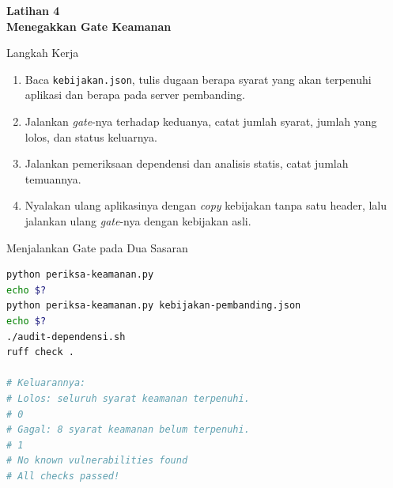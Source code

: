 \documentclass[aspectratio=169, table, 12pt]{beamer}
\begin{document}
\begin{frame}{\hfill}
  \centering
  \Huge{\textbf{Latihan 4\\Menegakkan Gate Keamanan}}
\end{frame}

\begin{frame}{{\Large Langkah Kerja}}
  \vspace{6pt}
  \begin{enumerate}
    \item Baca \texttt{kebijakan.json}, tulis dugaan berapa syarat yang akan
          terpenuhi aplikasi dan berapa pada server pembanding.
    \item Jalankan \textit{gate}-nya terhadap keduanya, catat jumlah syarat, jumlah
          yang lolos, dan status keluarnya.
    \item Jalankan pemeriksaan dependensi dan analisis statis, catat jumlah
          temuannya.
    \item Nyalakan ulang aplikasinya dengan \textit{copy} kebijakan tanpa satu
          header, lalu jalankan ulang \textit{gate}-nya dengan kebijakan asli.
  \end{enumerate}
\end{frame}

\begin{frame}[fragile]{{\Large Menjalankan Gate pada Dua Sasaran}}
  \vspace{2pt}
\begin{lstlisting}[language=bash]
python periksa-keamanan.py
echo $?
python periksa-keamanan.py kebijakan-pembanding.json
echo $?
./audit-dependensi.sh
ruff check .

# Keluarannya:
# Lolos: seluruh syarat keamanan terpenuhi.
# 0
# Gagal: 8 syarat keamanan belum terpenuhi.
# 1
# No known vulnerabilities found
# All checks passed!
\end{lstlisting}
\end{frame}
\end{document}
